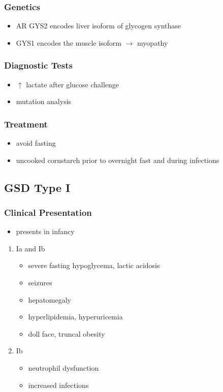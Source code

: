 \documentclass[12pt]{scrartcl}
\begin{document}
\subsubsection{Genetics}
\label{sec:org10d5d48}
\begin{itemize}
\item AR GYS2 encodes liver isoform of glycogen synthase
\item GYS1 encodes the muscle isoform \(\to\) myopathy
\end{itemize}
\subsubsection{Diagnostic Tests}
\label{sec:orgc8a6645}
\begin{itemize}
\item \(\uparrow\) lactate after glucose challenge
\item mutation analysis
\end{itemize}
\subsubsection{Treatment}
\label{sec:org35fb959}
\begin{itemize}
\item avoid fasting
\item uncooked cornstarch prior to overnight fast and during infections
\end{itemize}
\subsection{GSD Type I}
\label{sec:org855e340}
\subsubsection{Clinical Presentation}
\label{sec:orgcf3bfd8}
\begin{itemize}
\item presents in infancy
\end{itemize}
\begin{enumerate}
\item Ia and Ib
\label{sec:orgc9af23d}
\begin{itemize}
\item severe fasting hypoglycema, lactic acidosis
\item seizures
\item hepatomegaly
\item hyperlipidemia, hyperuricemia
\item doll face, truncal obesity
\end{itemize}
\item Ib
\label{sec:org1775cee}
\begin{itemize}
\item neutrophil dysfunction
\item increased infections
\end{itemize}
\end{enumerate}
\end{document}
